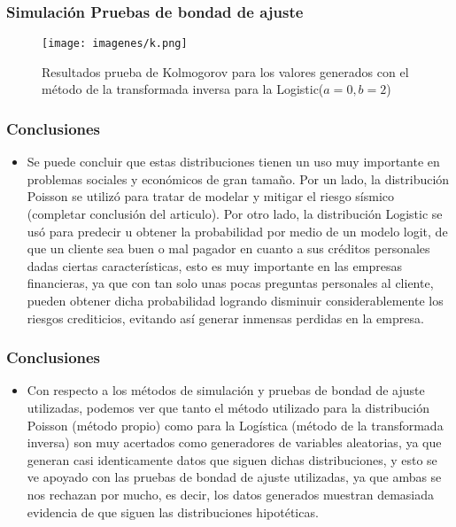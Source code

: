 \documentclass[12pt]{beamer}
\begin{document}
\begin{frame}
\frametitle{Simulación Pruebas de bondad de ajuste}
\begin{figure}
  \centering
  \texttt{[image: imagenes/k.png]}
  \caption{Resultados prueba de Kolmogorov para los valores generados con el método de la transformada inversa para la Logistic($a=0,b=2$)}\label{figura1}
\end{figure}
\end{frame}


\begin{frame}
\frametitle{Conclusiones}
\begin{itemize}
\item Se puede concluir que estas distribuciones tienen un uso muy importante en problemas sociales y económicos de gran tamaño. Por un lado, la distribución Poisson se utilizó para tratar de modelar y mitigar el riesgo sísmico (completar conclusión del articulo). Por otro lado, la distribución Logistic se usó para predecir u obtener la probabilidad por medio de un modelo logit, de que un cliente sea buen o mal pagador en cuanto a sus créditos personales dadas ciertas características, esto es muy importante en las empresas financieras, ya que con tan solo unas pocas preguntas personales al cliente, pueden obtener dicha probabilidad logrando disminuir considerablemente los riesgos crediticios, evitando así generar inmensas perdidas en la empresa.
\end{itemize}
\end{frame}

\begin{frame}
\frametitle{Conclusiones}
\begin{itemize}
\item Con respecto a los métodos de simulación y pruebas de bondad de ajuste utilizadas, podemos ver que tanto el método utilizado para la distribución Poisson (método propio) como para la Logística (método de la transformada inversa) son muy acertados como generadores de variables aleatorias, ya que generan casi identicamente datos que siguen dichas distribuciones, y esto se ve apoyado con las pruebas de bondad de ajuste utilizadas, ya que ambas se nos rechazan por mucho, es decir, los datos generados muestran demasiada evidencia de que siguen las distribuciones hipotéticas.
\end{itemize}
\end{frame}
\end{document}

